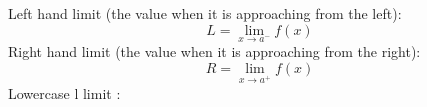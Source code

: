 \documentclass{article}
\begin{document}
	
	\noindent Left hand limit (the value when it is approaching from the left):\[L=\lim_{x\to a^-}f(x)\]
	Right hand limit (the value when it is approaching from the right):\[R=\lim_{x\to a^+}f(x)\]
	Lowercase l limit : 
	
\end{document}
